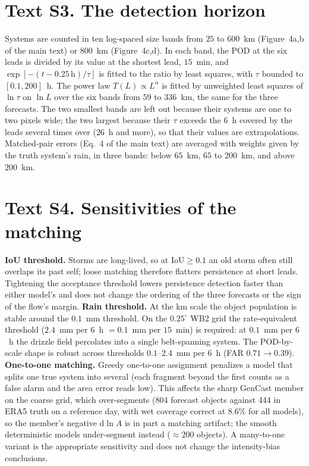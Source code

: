 \documentclass[11pt]{article}
\begin{document}
\section*{Text S3. The detection horizon}
Systems are counted in ten log-spaced size bands from $25$ to $600$~km
(Figure~4a,b of the main text) or $800$~km (Figure~4c,d). In each band, the
POD at the six leads is divided by its value at the shortest lead,
$15$~min, and $\exp[-(t - 0.25\,\mathrm{h})/\tau]$ is fitted to the ratio
by least squares, with $\tau$ bounded to $[0.1, 200]$~h. The power law
$T(L) \propto L^{\alpha}$ is fitted by unweighted least squares of
$\ln\tau$ on $\ln L$ over the six bands from $59$ to $336$~km, the same
for the three forecasts. The two smallest bands are left out because their
systems are one to two pixels wide; the two largest because their $\tau$
exceeds the $6$~h covered by the leads several times over ($26$~h and
more), so that their values are extrapolations. Matched-pair errors
(Eq.~4 of the main text) are averaged with weights given by the truth
system's rain, in three bands: below $65$~km, $65$ to $200$~km, and above
$200$~km.

\section*{Text S4. Sensitivities of the matching}
\textbf{IoU threshold.} Storms are long-lived, so at $\mathrm{IoU} \ge 0.1$
an old storm often still overlaps its past self; loose matching therefore
flatters persistence at short leads. Tightening the acceptance threshold
lowers persistence detection faster than either model's and does not change
the ordering of the three forecasts or the sign of the flow's margin.
\textbf{Rain threshold.} At the km scale the object population is stable
around the $0.1$~mm threshold. On the $0.25^{\circ}$ WB2 grid the
rate-equivalent threshold ($2.4$~mm per $6$~h $= 0.1$~mm per $15$~min)
is required: at $0.1$~mm per $6$~h the drizzle field percolates into a
single belt-spanning system. The POD-by-scale shape is robust across
thresholds $0.1$--$2.4$~mm per $6$~h (FAR $0.71 \rightarrow 0.39$).
\textbf{One-to-one matching.} Greedy one-to-one assignment penalizes a
model that splits one true system into several (each fragment beyond the
first counts as a false alarm and the area error reads low). This affects
the sharp GenCast member on the coarse grid, which over-segments (804
forecast objects against 444 in ERA5 truth on a reference day, with wet
coverage correct at $8.6\%$ for all models), so the member's negative
$\mathrm{d}\ln A$ is in part a matching artifact; the smooth deterministic
models under-segment instead ($\approx 200$ objects). A many-to-one variant
is the appropriate sensitivity and does not change the intensity-bias
conclusions.
\end{document}
